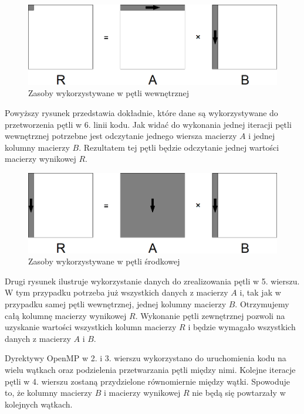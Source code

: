\documentclass{article}
\begin{document}
\begin{figure}[H]
	\centering
	\includegraphics[width=\linewidth]{./images/3/lokIn.png}
	\caption{Zasoby wykorzystywane w pętli wewnętrznej}
	\label{fig:3inner}
\end{figure}

Powyższy rysunek przedstawia dokładnie, które dane są wykorzystywane do przetworzenia pętli w 6. linii kodu. Jak widać do wykonania jednej iteracji pętli wewnętrznej potrzebne jest odczytanie jednego wiersza macierzy $A$ i jednej kolumny macierzy $B$. Rezultatem tej pętli będzie odczytanie jednej wartości macierzy wynikowej $R$.

\begin{figure}[H]
	\centering
	\includegraphics[width=\linewidth]{./images/3/lokMed.png}
	\caption{Zasoby wykorzystywane w pętli środkowej}
	\label{fig:3medium}
\end{figure}

Drugi rysunek ilustruje wykorzystanie danych do zrealizowania pętli w 5. wierszu. W tym przypadku potrzeba już wszystkich danych z macierzy $A$ i, tak jak w przypadku samej pętli wewnętrznej, jednej kolumny macierzy $B$. Otrzymujemy całą kolumnę macierzy wynikowej $R$. Wykonanie pętli zewnętrznej pozwoli na uzyskanie wartości wszystkich kolumn macierzy $R$ i będzie wymagało wszystkich danych z macierzy $A$ i $B$.

Dyrektywy OpenMP w 2. i 3. wierszu wykorzystano do uruchomienia kodu na wielu wątkach oraz podzielenia przetwarzania pętli między nimi. Kolejne iteracje pętli w 4. wierszu zostaną przydzielone równomiernie między wątki. Spowoduje to, że kolumny macierzy $B$ i macierzy wynikowej $R$ nie będą się powtarzały w kolejnych wątkach.
\end{document}
